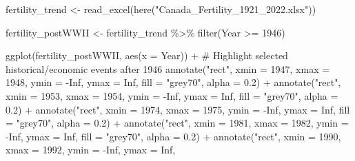 \documentclass[
  letterpaper,
  DIV=11,
  numbers=noendperiod]{scrartcl}
\newenvironment{Shaded}{\begin{snugshade}}{\end{snugshade}}
\newcommand{\AttributeTok}[1]{\textcolor[rgb]{0.40,0.45,0.13}{#1}}
\newcommand{\CommentTok}[1]{\textcolor[rgb]{0.37,0.37,0.37}{#1}}
\newcommand{\ConstantTok}[1]{\textcolor[rgb]{0.56,0.35,0.01}{#1}}
\newcommand{\DecValTok}[1]{\textcolor[rgb]{0.68,0.00,0.00}{#1}}
\newcommand{\FloatTok}[1]{\textcolor[rgb]{0.68,0.00,0.00}{#1}}
\newcommand{\FunctionTok}[1]{\textcolor[rgb]{0.28,0.35,0.67}{#1}}
\newcommand{\NormalTok}[1]{\textcolor[rgb]{0.00,0.23,0.31}{#1}}
\newcommand{\OtherTok}[1]{\textcolor[rgb]{0.00,0.23,0.31}{#1}}
\newcommand{\SpecialCharTok}[1]{\textcolor[rgb]{0.37,0.37,0.37}{#1}}
\newcommand{\StringTok}[1]{\textcolor[rgb]{0.13,0.47,0.30}{#1}}
\begin{document}
\begin{Shaded}
\begin{Highlighting}[]
\NormalTok{fertility\_trend }\OtherTok{\textless{}{-}} \FunctionTok{read\_excel}\NormalTok{(}\FunctionTok{here}\NormalTok{(}\StringTok{"Canada\_Fertility\_1921\_2022.xlsx"}\NormalTok{))}

\NormalTok{fertility\_postWWII }\OtherTok{\textless{}{-}}\NormalTok{ fertility\_trend }\SpecialCharTok{\%\textgreater{}\%}
  \FunctionTok{filter}\NormalTok{(Year }\SpecialCharTok{\textgreater{}=} \DecValTok{1946}\NormalTok{)}

\FunctionTok{ggplot}\NormalTok{(fertility\_postWWII, }\FunctionTok{aes}\NormalTok{(}\AttributeTok{x =}\NormalTok{ Year)) }\SpecialCharTok{+}
  \CommentTok{\# Highlight selected historical/economic events after 1946}
  \FunctionTok{annotate}\NormalTok{(}\StringTok{"rect"}\NormalTok{, }\AttributeTok{xmin =} \DecValTok{1947}\NormalTok{, }\AttributeTok{xmax =} \DecValTok{1948}\NormalTok{, }\AttributeTok{ymin =} \SpecialCharTok{{-}}\ConstantTok{Inf}\NormalTok{, }\AttributeTok{ymax =} \ConstantTok{Inf}\NormalTok{,}
           \AttributeTok{fill =} \StringTok{"grey70"}\NormalTok{, }\AttributeTok{alpha =} \FloatTok{0.2}\NormalTok{) }\SpecialCharTok{+}
  \FunctionTok{annotate}\NormalTok{(}\StringTok{"rect"}\NormalTok{, }\AttributeTok{xmin =} \DecValTok{1953}\NormalTok{, }\AttributeTok{xmax =} \DecValTok{1954}\NormalTok{, }\AttributeTok{ymin =} \SpecialCharTok{{-}}\ConstantTok{Inf}\NormalTok{, }\AttributeTok{ymax =} \ConstantTok{Inf}\NormalTok{,}
           \AttributeTok{fill =} \StringTok{"grey70"}\NormalTok{, }\AttributeTok{alpha =} \FloatTok{0.2}\NormalTok{) }\SpecialCharTok{+}
  \FunctionTok{annotate}\NormalTok{(}\StringTok{"rect"}\NormalTok{, }\AttributeTok{xmin =} \DecValTok{1974}\NormalTok{, }\AttributeTok{xmax =} \DecValTok{1975}\NormalTok{, }\AttributeTok{ymin =} \SpecialCharTok{{-}}\ConstantTok{Inf}\NormalTok{, }\AttributeTok{ymax =} \ConstantTok{Inf}\NormalTok{,}
           \AttributeTok{fill =} \StringTok{"grey70"}\NormalTok{, }\AttributeTok{alpha =} \FloatTok{0.2}\NormalTok{) }\SpecialCharTok{+}
  \FunctionTok{annotate}\NormalTok{(}\StringTok{"rect"}\NormalTok{, }\AttributeTok{xmin =} \DecValTok{1981}\NormalTok{, }\AttributeTok{xmax =} \DecValTok{1982}\NormalTok{, }\AttributeTok{ymin =} \SpecialCharTok{{-}}\ConstantTok{Inf}\NormalTok{, }\AttributeTok{ymax =} \ConstantTok{Inf}\NormalTok{,}
           \AttributeTok{fill =} \StringTok{"grey70"}\NormalTok{, }\AttributeTok{alpha =} \FloatTok{0.2}\NormalTok{) }\SpecialCharTok{+}
  \FunctionTok{annotate}\NormalTok{(}\StringTok{"rect"}\NormalTok{, }\AttributeTok{xmin =} \DecValTok{1990}\NormalTok{, }\AttributeTok{xmax =} \DecValTok{1992}\NormalTok{, }\AttributeTok{ymin =} \SpecialCharTok{{-}}\ConstantTok{Inf}\NormalTok{, }\AttributeTok{ymax =} \ConstantTok{Inf}\NormalTok{,}

\end{Highlighting}
\end{Shaded}
\end{document}
